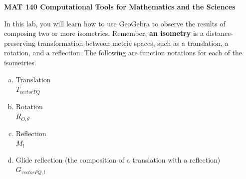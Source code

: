 \documentclass[11pt]{article}
\begin{document}
\begin{center}
{\bf MAT 140 \quad Computational Tools for Mathematics and the Sciences}

\end{center}

\medskip
{}

\smallskip


\smallskip


\smallskip



\vspace{0.2 in}



\smallskip

\noindent In this lab, you will learn how to use GeoGebra to observe the results of composing two or more isometries. Remember, {\bf an isometry} is a distance-preserving transformation between metric spaces, such as a translation, a rotation, and a reflection. The following are function notations for each of the isometries. 
	\begin{enumerate}[(a)]
	\item Translation \\ $T_{vector PQ}$ 	
	\item Rotation \\ $R_{O, \theta}$
	\item Reflection \\ $M_l$ 
	\item Glide reflection (the composition of a translation with a reflection) \\ $G_{vector PQ, l}$\\
	\end{enumerate}


\vspace{0.2 in}

\end{document}

